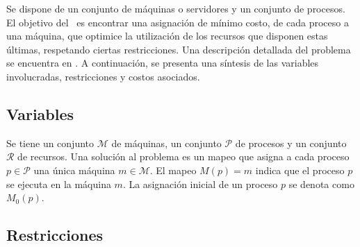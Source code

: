 \documentclass[../informe2.tex]{subfiles}
\begin{document}

Se dispone de un conjunto  de máquinas o servidores y un conjunto de procesos. El objetivo del \mrp\ es encontrar una asignación de mínimo costo, de cada proceso a una máquina, que optimice la utilización de los recursos que disponen estas últimas, respetando ciertas restricciones. Una descripción detallada del problema se encuentra en \cite{2012ProblemDefinition}. A continuación, se presenta una síntesis de las variables involucradas, restricciones y costos asociados.

\subsection{Variables}
Se tiene un conjunto $\mathcal{M}$ de máquinas, un conjunto $\mathcal{P}$ de procesos y un conjunto $\mathcal{R}$ de recursos. Una solución al problema es un mapeo que asigna a cada proceso $p \in \mathcal{P}$ una única máquina $m \in \mathcal{M}$. El mapeo $M(p) = m$ indica que el proceso $p$ se ejecuta en la máquina $m$. La asignación inicial de un proceso $p$ se denota como $M_0(p)$.


\subsection{Restricciones}
\end{document}
